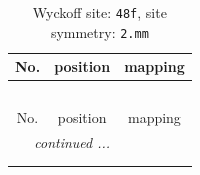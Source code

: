 \documentclass[fleqn,8pt]{jsarticle}
\begin{document}
\renewcommand{\arraystretch}{1.2}
\begin{longtable}{ccc}
\caption{Wyckoff site: {\tt 48f}, site symmetry: {\tt 2.mm}}
 \\
 \hline \hline
No. & position & mapping \\ \hline \endfirsthead

\multicolumn{2}{l}{\tablename\ \thetable{}} \\
 \hline \hline
No. & position & mapping \\ \hline \endhead

 \hline \hline
\multicolumn{2}{r}{\footnotesize\it continued ...} \\ \endfoot

 \hline \hline
\multicolumn{2}{r}{} \\ \endlastfoot


\end{longtable}
\end{document}
